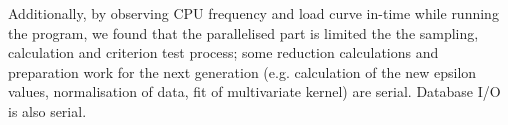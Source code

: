 Additionally, by observing CPU frequency and load curve in-time while running the program, we found that the parallelised part is limited the the sampling, calculation and criterion test process; some reduction calculations and preparation work for the next generation (e.g. calculation of the new epsilon values, normalisation of data, fit of multivariate kernel) are serial. Database I/O is also serial.








